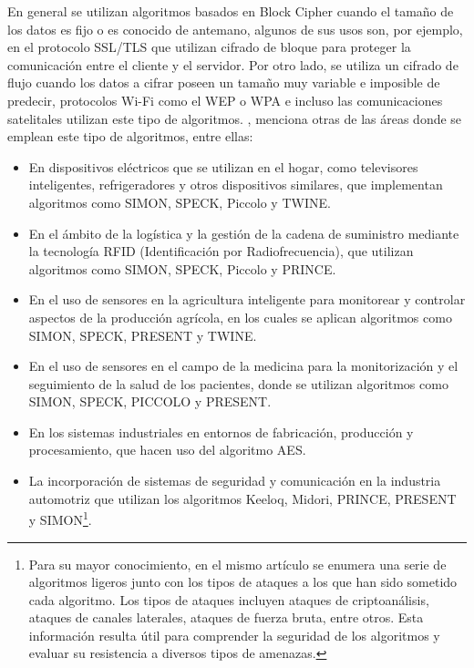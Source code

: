 \documentclass[a4paper,10pt]{article}
\begin{document}
	En general se utilizan algoritmos basados en Block Cipher cuando el tamaño de los datos es fijo o es conocido de antemano, algunos de sus usos son, por ejemplo, en el protocolo SSL/TLS que utilizan cifrado de bloque para proteger la comunicación entre el cliente y el servidor. Por otro lado, se utiliza un cifrado de flujo cuando los datos a cifrar poseen un tamaño muy variable e imposible de predecir, protocolos Wi-Fi como el WEP o WPA e incluso las comunicaciones satelitales utilizan este tipo de algoritmos. \textcite{thakor2020lightweight}, menciona otras de las áreas donde se emplean este tipo de algoritmos, entre ellas:
	\begin{itemize}
		\item En dispositivos eléctricos que se utilizan en el hogar, como televisores inteligentes, refrigeradores y otros dispositivos similares, que implementan algoritmos como SIMON, SPECK, Piccolo y TWINE. 
		\item En el ámbito de la logística y la gestión de la cadena de suministro mediante la tecnología RFID (Identificación por Radiofrecuencia), que utilizan algoritmos como SIMON, SPECK, Piccolo y PRINCE.
		\item En el uso de sensores en la agricultura inteligente para monitorear y controlar aspectos de la producción agrícola, en los cuales se aplican algoritmos como SIMON, SPECK, PRESENT y TWINE.
		\item En el uso de sensores en el campo de la medicina para la monitorización y el seguimiento de la salud de los pacientes, donde se utilizan algoritmos como SIMON, SPECK, PICCOLO y PRESENT.
		\item En los sistemas industriales en entornos de fabricación, producción y procesamiento, que hacen uso del algoritmo AES.
		\item La incorporación de sistemas de seguridad y comunicación en la industria automotriz que utilizan los algoritmos Keeloq, Midori, PRINCE, PRESENT y SIMON\footnote{Para su mayor conocimiento, en el mismo artículo se enumera una serie de algoritmos ligeros junto con los tipos de ataques a los que han sido sometido cada algoritmo. Los tipos de ataques incluyen ataques de criptoanálisis, ataques de canales laterales, ataques de fuerza bruta, entre otros. Esta información resulta útil para comprender la seguridad de los algoritmos y evaluar su resistencia a diversos tipos de amenazas.}.
	\end{itemize}
\end{document}
